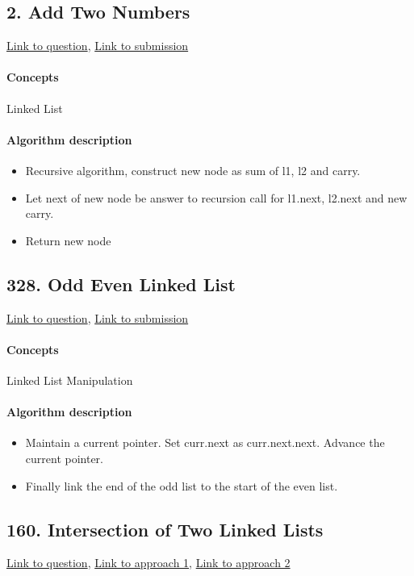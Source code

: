 \documentclass[11pt]{book}
\begin{document}
\subsection{2. Add Two Numbers}
\href{https://leetcode.com/problems/add-two-numbers/}{Link to question},
\href{https://leetcode.com/submissions/detail/337941956/}{Link to submission}
\paragraph{Concepts}
Linked List
\paragraph{Algorithm description}
\begin{itemize}
    \item Recursive algorithm, construct new node as sum of l1, l2 and carry.
    \item Let next of new node be answer to recursion call for l1.next, l2.next and new carry.
    \item Return new node
\end{itemize}

\subsection{328. Odd Even Linked List}
\href{https://leetcode.com/problems/odd-even-linked-list/}{Link to question},
\href{https://leetcode.com/submissions/detail/337950330/}{Link to submission}
\paragraph{Concepts}
Linked List Manipulation
\paragraph{Algorithm description}
\begin{itemize}
    \item Maintain a current pointer. Set curr.next as curr.next.next. Advance the current pointer.
    \item Finally link the end of the odd list to the start of the even list.
\end{itemize}

\subsection{160. Intersection of Two Linked Lists}
\href{https://leetcode.com/problems/intersection-of-two-linked-lists/}{Link to question},
\href{https://leetcode.com/submissions/detail/329638899/}{Link to approach 1},
\href{https://leetcode.com/submissions/detail/337973211/}{Link to approach 2}
\end{document}
